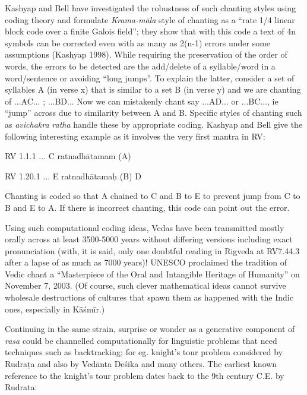 Kashyap and Bell have investigated the robustness of such chanting styles using coding theory and formulate \textsl{Krama-māla} style of chanting as a “rate 1/4 linear block code over a finite Galois field”; they show that with this code a text of 4n symbols can be corrected even with as many as 2(n-1) errors under some assumptions (Kashyap 1998). While requiring the preservation of the order of words, the errors to be detected are the add/delete of a syllable/word in a word/sentence or avoiding “long jumps”. To explain the latter, consider a set of syllables A (in verse x) that is similar to a set B (in verse y) and we are chanting of  ...AC... ; ...BD... Now we can mistakenly chant say ...AD... or ...BC..., ie “jump” across due to similarity between A and B. Specific styles of chanting such as \textsl{avichakra} \textsl{ratha} handle these by appropriate coding. Kashyap and Bell give the following interesting example as it involves the very first mantra in RV:

\begin{myquote}
RV 1.1.1     ... C ratnadhātamam (A)

RV 1.20.1    ... E ratnadhātamaḥ (B) D
\end{myquote}

Chanting is coded so that A chained to C and B to E to prevent jump from C to B and E to A. If there is incorrect chanting, this code can point out the error. 

Using such computational coding ideas, Vedas have been transmitted mostly orally across at least 3500-5000 years without differing versions including exact pronunciation (with, it is said, only one doubtful reading in Rigveda at RV7.44.3 after a lapse of as much as 7000 years)! UNESCO proclaimed the tradition of Vedic chant a “Masterpiece of the Oral and Intangible Heritage of Humanity” on November 7, 2003. (Of course, such clever mathematical ideas cannot survive wholesale destructions of cultures that spawn them as happened with the Indic ones, especially in Kāśmīr.)

Continuing in the same strain, surprise or wonder as a generative component of \textsl{rasa} could be channelled computationally for linguistic problems that need techniques such as backtracking; for eg. knight’s tour problem considered by Rudraṭa and also by Vedānta Deśika and many others. The earliest known reference to the knight's tour problem dates back to the 9th century C.E. by Rudrata:

